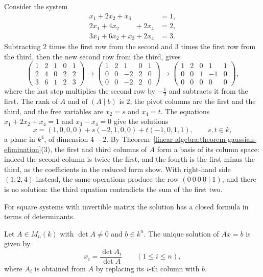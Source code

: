 \begin{example}\label{linear-algebra:example-gaussian-elimination}
Consider the system
\[
\begin{aligned}
x_1 + 2x_2 + x_3 \phantom{{}+ 2x_4} &= 1,\\
2x_1 + 4x_2 \phantom{{}+ x_3} + 2x_4 &= 2,\\
3x_1 + 6x_2 + x_3 + 2x_4 &= 3.
\end{aligned}
\]
Subtracting $2$ times the first row from the second and $3$ times the first row from the third, then the new second row from the third, gives
\[
\left(\begin{array}{cccc|c}1 & 2 & 1 & 0 & 1\\ 2 & 4 & 0 & 2 & 2\\ 3 & 6 & 1 & 2 & 3\end{array}\right) \to
\left(\begin{array}{cccc|c}1 & 2 & 1 & 0 & 1\\ 0 & 0 & -2 & 2 & 0\\ 0 & 0 & -2 & 2 & 0\end{array}\right) \to
\left(\begin{array}{cccc|c}1 & 2 & 0 & 1 & 1\\ 0 & 0 & 1 & -1 & 0\\ 0 & 0 & 0 & 0 & 0\end{array}\right),
\]
where the last step multiplies the second row by $-\frac12$ and subtracts it from the first. The rank of $A$ and of $(A \mid b)$ is $2$, the pivot columns are the first and the third, and the free
variables are $x_2 = s$ and $x_4 = t$. The equations $x_1 + 2x_2 + x_4 = 1$ and $x_3 - x_4 = 0$ give the solutions
\[
x = (1, 0, 0, 0) + s(-2, 1, 0, 0) + t(-1, 0, 1, 1), \qquad s, t \in k,
\]
a plane in $k^4$, of dimension $4 - 2$. By Theorem~\ref{linear-algebra:theorem-gaussian-elimination}(3), the first and third columns of $A$ form a basis of its column space: indeed the second column is
twice the first, and the fourth is the first minus the third, as the coefficients in the reduced form show. With right-hand side $(1, 2, 4)$ instead, the same operations produce the row
$(0\ 0\ 0\ 0 \mid 1)$, and there is no solution: the third equation contradicts the sum of the first two.
\end{example}

For square systems with invertible matrix the solution has a closed formula in terms of determinants.

\begin{proposition}\label{linear-algebra:proposition-cramer}
Let $A \in M_n(k)$ with $\det A \neq 0$ and $b \in k^n$. The unique solution of $Ax = b$ is given by
\[
x_i = \frac{\det A_i}{\det A} \qquad (1 \leq i \leq n),
\]
where $A_i$ is obtained from $A$ by replacing its $i$-th column with $b$.
\end{proposition}

